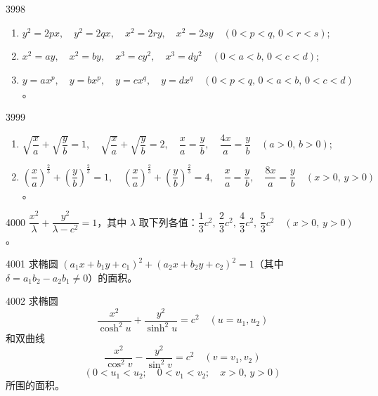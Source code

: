 \begin{prob}[L]{3998}
\begin{enumerate}[label=(\alph*), itemsep=2pt, topsep=3pt]
\item $y^2 = 2px, \quad y^2 = 2qx, \quad x^2 = 2ry, \quad x^2 = 2sy \quad (0 < p < q, \, 0 < r < s)$;
\item $x^2 = ay, \quad x^2 = by, \quad x^3 = cy^2, \quad x^3 = dy^2 \quad (0 < a < b, \, 0 < c < d)$;
\item $y = ax^p, \quad y = bx^p, \quad y = cx^q, \quad y = dx^q \quad (0 < p < q, \, 0 < a < b, \, 0 < c < d)$。
\end{enumerate}
\end{prob}

\begin{prob}[M]{3999}
\begin{enumerate}[label=(\alph*), itemsep=2pt, topsep=3pt]
\item $\sqrt{\dfrac{x}{a}} + \sqrt{\dfrac{y}{b}} = 1, \quad \sqrt{\dfrac{x}{a}} + \sqrt{\dfrac{y}{b}} = 2, \quad \dfrac{x}{a} = \dfrac{y}{b}, \quad \dfrac{4x}{a} = \dfrac{y}{b} \quad (a > 0, \, b > 0)$;
\item $\left(\dfrac{x}{a}\right)^{\frac{2}{3}} + \left(\dfrac{y}{b}\right)^{\frac{2}{3}} = 1, \quad \left(\dfrac{x}{a}\right)^{\frac{2}{3}} + \left(\dfrac{y}{b}\right)^{\frac{2}{3}} = 4, \quad \dfrac{x}{a} = \dfrac{y}{b}, \quad \dfrac{8x}{a} = \dfrac{y}{b} \quad (x > 0, \, y > 0)$。
\end{enumerate}
\end{prob}

\begin{prob}[M]{4000}
$\dfrac{x^2}{\lambda} + \dfrac{y^2}{\lambda - c^2} = 1$，其中 $\lambda$ 取下列各值：$\dfrac{1}{3}c^2, \, \dfrac{2}{3}c^2, \, \dfrac{4}{3}c^2, \, \dfrac{5}{3}c^2 \quad (x > 0, \, y > 0)$。
\end{prob}

\begin{prob}[M]{4001}
求椭圆 $(a_1 x + b_1 y + c_1)^2 + (a_2 x + b_2 y + c_2)^2 = 1$（其中 $\delta = a_1 b_2 - a_2 b_1 \neq 0$）的面积。
\end{prob}

\begin{prob}[M]{4002}
求椭圆
\[
\frac{x^2}{\cosh^2 u} + \frac{y^2}{\sinh^2 u} = c^2 \quad (u = u_1, u_2)
\]
和双曲线
\[
\frac{x^2}{\cos^2 v} - \frac{y^2}{\sin^2 v} = c^2 \quad (v = v_1, v_2)
\]
\[
(0 < u_1 < u_2; \quad 0 < v_1 < v_2; \quad x > 0, \, y > 0)
\]
所围的面积。
\end{prob}

